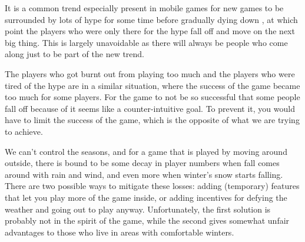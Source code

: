 It is a common trend especially present in mobile games for new games to be surrounded by lots of hype  for some time before gradually dying down , at which point the players who were only there for the hype fall off and move on the next big thing. This is largely unavoidable as there will always be people who come along just to be part of the new trend.

The players who got burnt out from playing too much and the players who were tired of the hype are in a similar situation, where the success of the game became too much for some players. For the game to not be so successful that some people fall off because of it seems like a counter-intuitive goal. To prevent it, you would have to limit the success of the game, which is the opposite of what we are trying to achieve.

We can't control the seasons, and for a game that is played by moving around outside, there is bound to be some decay in player numbers when fall comes around with rain and wind, and even more when winter's snow starts falling. There are two possible ways to mitigate these losses: adding (temporary) features that let you play more of the game inside, or adding incentives for defying the weather and going out to play anyway. Unfortunately, the first solution is probably not in the spirit of the game, while the second gives somewhat unfair advantages to those who live in areas with comfortable winters. 
